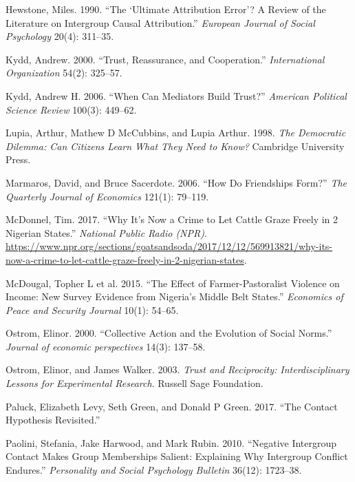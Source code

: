 \documentclass[11pt]{article}
\begin{document}
\hypertarget{ref-hewstone1990ultimate}{}
Hewstone, Miles. 1990. ``The `Ultimate Attribution Error'? A Review of
the Literature on Intergroup Causal Attribution.'' \emph{European
Journal of Social Psychology} 20(4): 311--35.

\hypertarget{ref-kydd2000trust}{}
Kydd, Andrew. 2000. ``Trust, Reassurance, and Cooperation.''
\emph{International Organization} 54(2): 325--57.

\hypertarget{ref-kydd2006can}{}
Kydd, Andrew H. 2006. ``When Can Mediators Build Trust?'' \emph{American
Political Science Review} 100(3): 449--62.

\hypertarget{ref-lupia1998democratic}{}
Lupia, Arthur, Mathew D McCubbins, and Lupia Arthur. 1998. \emph{The
Democratic Dilemma: Can Citizens Learn What They Need to Know?}
Cambridge University Press.

\hypertarget{ref-marmaros2006friendships}{}
Marmaros, David, and Bruce Sacerdote. 2006. ``How Do Friendships Form?''
\emph{The Quarterly Journal of Economics} 121(1): 79--119.

\hypertarget{ref-mcdonnel2017graze}{}
McDonnel, Tim. 2017. ``Why It's Now a Crime to Let Cattle Graze Freely
in 2 Nigerian States.'' \emph{National Public Radio (NPR)}.
\url{https://www.npr.org/sections/goatsandsoda/2017/12/12/569913821/why-its-now-a-crime-to-let-cattle-graze-freely-in-2-nigerian-states}.

\hypertarget{ref-mcdougal2015effect}{}
McDougal, Topher L et al. 2015. ``The Effect of Farmer-Pastoralist
Violence on Income: New Survey Evidence from Nigeria's Middle Belt
States.'' \emph{Economics of Peace and Security Journal} 10(1): 54--65.

\hypertarget{ref-ostrom2000collective}{}
Ostrom, Elinor. 2000. ``Collective Action and the Evolution of Social
Norms.'' \emph{Journal of economic perspectives} 14(3): 137--58.

\hypertarget{ref-ostrom2003trust}{}
Ostrom, Elinor, and James Walker. 2003. \emph{Trust and Reciprocity:
Interdisciplinary Lessons for Experimental Research}. Russell Sage
Foundation.

\hypertarget{ref-paluck2017contact}{}
Paluck, Elizabeth Levy, Seth Green, and Donald P Green. 2017. ``The
Contact Hypothesis Revisited.''

\hypertarget{ref-paolini2010negative}{}
Paolini, Stefania, Jake Harwood, and Mark Rubin. 2010. ``Negative
Intergroup Contact Makes Group Memberships Salient: Explaining Why
Intergroup Conflict Endures.'' \emph{Personality and Social Psychology
Bulletin} 36(12): 1723--38.
\end{document}
